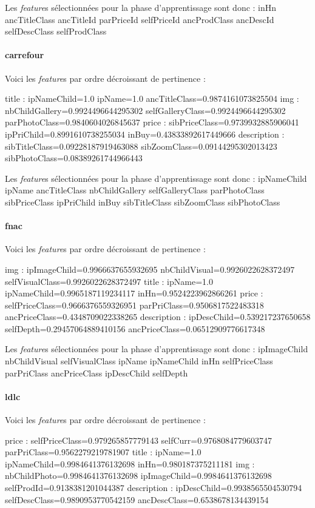 \documentclass{article}
\begin{document}
Les \emph{feature}s sélectionnées pour la phase d'apprentissage sont donc :
inHn ancTitleClass ancTitleId parPriceId selfPriceId ancProdClass ancDescId selfDescClass selfProdClass

\paragraph{carrefour}
Voici les \emph{feature}s par ordre décroissant de pertinence :
\begin{itemize}
title : ipNameChild=1.0 ipName=1.0 ancTitleClass=0.9874161073825504
img : nbChildGallery=0.9924496644295302 selfGalleryClass=0.9924496644295302 parPhotoClass=0.9840604026845637
price : sibPriceClass=0.9739932885906041 ipPriChild=0.8991610738255034 inBuy=0.43833892617449666
description : sibTitleClass=0.09228187919463088 sibZoomClass=0.09144295302013423 sibPhotoClass=0.08389261744966443
\end{itemize}

Les \emph{feature}s sélectionnées pour la phase d'apprentissage sont donc :
ipNameChild ipName ancTitleClass nbChildGallery selfGalleryClass parPhotoClass sibPriceClass ipPriChild inBuy sibTitleClass sibZoomClass sibPhotoClass

\paragraph{fnac}
Voici les \emph{feature}s par ordre décroissant de pertinence :
\begin{itemize}
img : ipImageChild=0.9966637655932695 nbChildVisual=0.9926022628372497 selfVisualClass=0.9926022628372497
title : ipName=1.0 ipNameChild=0.9965187119234117 inHn=0.9524223962866261
price : selfPriceClass=0.9666376559326951 parPriClass=0.9506817522483318 ancPriceClass=0.4348709022338265
description : ipDescChild=0.539217237650658 selfDepth=0.29457064889410156 ancPriceClass=0.06512909776617348
\end{itemize}

Les \emph{feature}s sélectionnées pour la phase d'apprentissage sont donc :
ipImageChild nbChildVisual selfVisualClass ipName ipNameChild inHn selfPriceClass parPriClass ancPriceClass ipDescChild selfDepth

\paragraph{ldlc}
Voici les \emph{feature}s par ordre décroissant de pertinence :
\begin{itemize}
price : selfPriceClass=0.979265857779143 selfCurr=0.9768084779603747 parPriClass=0.9562279219781907
title : ipName=1.0 ipNameChild=0.9984641376132698 inHn=0.980187375211181
img : nbChildPhoto=0.9984641376132698 ipImageChild=0.9984641376132698 selfProdId=0.9138381201044387
description : ipDescChild=0.9938565504530794 selfDescClass=0.9890953770542159 ancDescClass=0.6538678134439154
\end{itemize}
\end{document}
